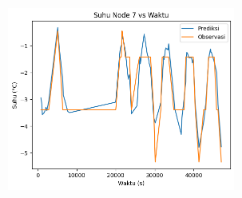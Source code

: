 \documentclass[8pt]{beamer}
\begin{document}
\begin{frame}
\begin{columns}[T]
\begin{figure}
      \end{figure}
      \begin{figure}
          \includegraphics[width=0.7\textwidth]{figure/paper_node7_temp_2018-05-20.png}
      \end{figure}
  \end{columns}
\end{frame}
\end{document}
